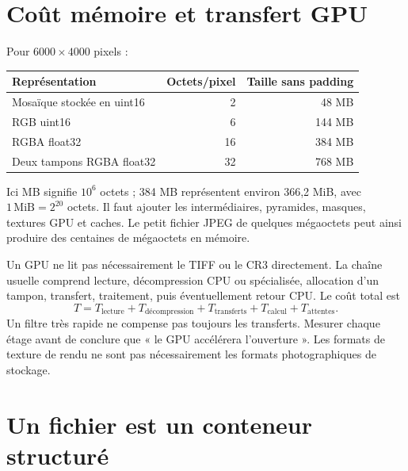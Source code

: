 \section{Coût mémoire et transfert GPU}
Pour $6000\times4000$ pixels :
\begin{center}
\begin{tabular}{lrr}
\toprule Représentation & Octets/pixel & Taille sans padding \\
\midrule Mosaïque stockée en uint16 & 2 & 48 MB \\
RGB uint16 & 6 & 144 MB \\
RGBA float32 & 16 & 384 MB \\
Deux tampons RGBA float32 & 32 & 768 MB \\
\bottomrule
\end{tabular}
\end{center}
Ici MB signifie $10^6$ octets ; 384 MB représentent environ
366,2 MiB, avec $1\,\mathrm{MiB}=2^{20}$ octets. Il faut ajouter
les intermédiaires, pyramides, masques, textures GPU et caches.
Le petit fichier JPEG de quelques mégaoctets peut ainsi produire
des centaines de mégaoctets en mémoire.

Un GPU ne lit pas nécessairement le TIFF ou le CR3 directement.
La chaîne usuelle comprend lecture, décompression CPU ou spécialisée,
allocation d'un tampon, transfert, traitement, puis éventuellement
retour CPU. Le coût total est
\[
T=T_{\text{lecture}}+T_{\text{décompression}}+
T_{\text{transferts}}+T_{\text{calcul}}+T_{\text{attentes}}.
\]
Un filtre très rapide ne compense pas toujours les transferts.
Mesurer chaque étage avant de conclure que « le GPU accélérera
l'ouverture ». Les formats de texture de rendu ne sont pas
nécessairement les formats photographiques de stockage.

\section{Un fichier est un conteneur structuré}
